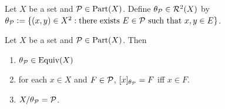\documentclass{book}
\begin{document}
	\begin{defn}
		Let $X$ be a set and $\mathcal{P} \in \text{Part}(X)$. Define $\theta_{\mathcal{P}} \in \mathcal{R}^2(X)$ by $\theta_{\mathcal{P}} \vcentcolon= \{(x,y) \in X^2: \text{there exists $E \in \mathcal{P}$ such that $x,y \in E$}\}$.
	\end{defn}
	
	\begin{ex}
		Let $X$ be a set and $\mathcal{P} \in \text{Part}(X)$. Then 
		\begin{enumerate}
			\item $\theta_{\mathcal{P}} \in \operatorname*{\text{Equiv}}(X)$
			\item for each $x \in X$ and $F \in \mathcal{P}$, $[x]_{\theta_{\mathcal{P}}} = F$ iff $x \in F$. 
			\item $X/\theta_{\mathcal{P}} = \mathcal{P}$.
		\end{enumerate} 
	\end{ex}
	
\end{document}
